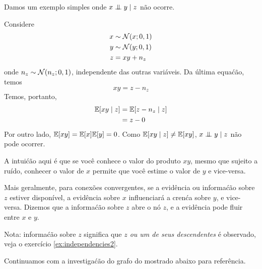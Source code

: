 \begin{exenumerate}
    \begin{solution}
        Damos um exemplo simples onde $x \mathrel{\perp\mspace{-10mu}\perp} y \mid
        z$ n\~ao ocorre.
        
        Considere
        \begin{align}
            x & \sim \mathcal{N}(x;0, 1)\\ y & \sim \mathcal{N}(y;0, 1)\\ z&= xy +
            n_z
        \end{align}
        onde $n_z \sim \mathcal{N}(n_z; 0, 1)$, independente das outras
        vari\'aveis. Da \'ultima equa\'c\~ao, temos
        \begin{equation}
            x y = z - n_z
        \end{equation}
        Temos, portanto,
        \begin{align}
            \mathbb{E}[xy \mid z] & = \mathbb{E}[z - n_z \mid z] \\ &= z - 0
        \end{align}
        Por outro lado, $\mathbb{E}[x y] = \mathbb{E}[x]\mathbb{E}[y] = 0$. Como $\mathbb{E}[xy \mid z] \neq \mathbb{E}[x y]$, $x \mathrel{\perp\mspace{-10mu}\perp} y \mid z$ n\~ao pode ocorrer.
        
        A intui\'c\~ao aqui \'e que se voc\^e conhece o valor do produto
        $xy$, mesmo que sujeito a ru\'ido, conhecer o valor de $x$ permite
        que voc\^e estime o valor de $y$ e vice-versa.
        
        Mais geralmente, para conex\~oes convergentes, se a evid\^encia ou
        informa\'c\~ao sobre $z$ estiver dispon\'ivel, a evid\^encia sobre $x$
        influenciar\'a a cren\'ca sobre $y$, e vice-versa. Dizemos que
        a informa\'c\~ao sobre $z$ abre o n\'o $z$, e a evid\^encia pode fluir
        entre $x$ e $y$.
        
        Nota: informa\'c\~ao sobre $z$ significa que \emph{$z$ ou um de seus
            descendentes} \'e observado, veja o exerc\'icio \ref{ex:independencies2}.
        
    \end{solution}
    
\end{exenumerate}



\label{ex:ordered-local-d-sep-independencies01}
Continuamos com a investiga\'c\~ao do grafo do  mostrado abaixo para refer\^encia.

